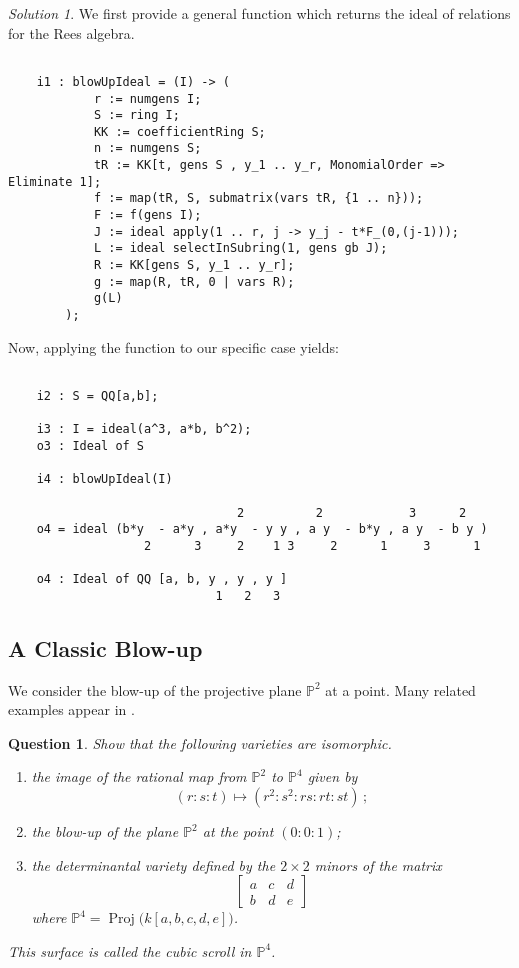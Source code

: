 \documentclass[12pt,noamsfonts]{amsart}
\def\PP{{\mathbb P}}
\newcommand{\Proj}{\operatorname{Proj}}
\newtheorem{question}{Question}
\theoremstyle{definition}
\theoremstyle{remark}
\newtheorem*{solution}{Solution}
\begin{document}
\begin{solution}
We first provide a general function which returns the ideal of
relations for the Rees algebra.
{\scriptsize
\begin{verbatim}

    i1 : blowUpIdeal = (I) -> (
            r := numgens I;
            S := ring I;
            KK := coefficientRing S;
            n := numgens S;
            tR := KK[t, gens S , y_1 .. y_r, MonomialOrder => Eliminate 1];
            f := map(tR, S, submatrix(vars tR, {1 .. n}));
            F := f(gens I);
            J := ideal apply(1 .. r, j -> y_j - t*F_(0,(j-1)));
            L := ideal selectInSubring(1, gens gb J);
            R := KK[gens S, y_1 .. y_r];
            g := map(R, tR, 0 | vars R);
            g(L)
        );
\end{verbatim}}
\noindent Now, applying the function to our specific case yields: 
                     
{\scriptsize
\begin{verbatim}                                              

    i2 : S = QQ[a,b];     
    
    i3 : I = ideal(a^3, a*b, b^2);
    o3 : Ideal of S
    
    i4 : blowUpIdeal(I)
    
                                2          2            3      2
    o4 = ideal (b*y  - a*y , a*y  - y y , a y  - b*y , a y  - b y )
                   2      3     2    1 3     2      1     3      1
    
    o4 : Ideal of QQ [a, b, y , y , y ]
                             1   2   3

\end{verbatim}}
\end{solution}

\subsection*{A Classic Blow-up}

We consider the blow-up of the projective plane $\PP^{2}$ at a point.
Many related examples appear in \cite[Section IV.2.2]{EH}.

\begin{question}
Show that the following varieties are isomorphic.
\begin{enumerate}
\item[(a)] the image of the rational map from $\PP^{2}$ to $\PP^{4}$
given by 
\[
(r:s:t) \mapsto (r^{2}:s^{2}:rs:rt:st) \, ;
\]
\item[(b)] the blow-up of the plane $\PP^{2}$ at the point $(0:0:1)$;
\item[(c)] the determinantal variety defined by the $2 \times 2$
minors of the matrix
\[
\begin{bmatrix} a & c & d \\ b & d & e \end{bmatrix}
\]
where $\PP^{4} = \Proj\big( k[a,b,c,d,e] \big)$.
\end{enumerate}
This surface is called the {\em cubic scroll} in $\PP^{4}$.
\end{question}
\end{document}
